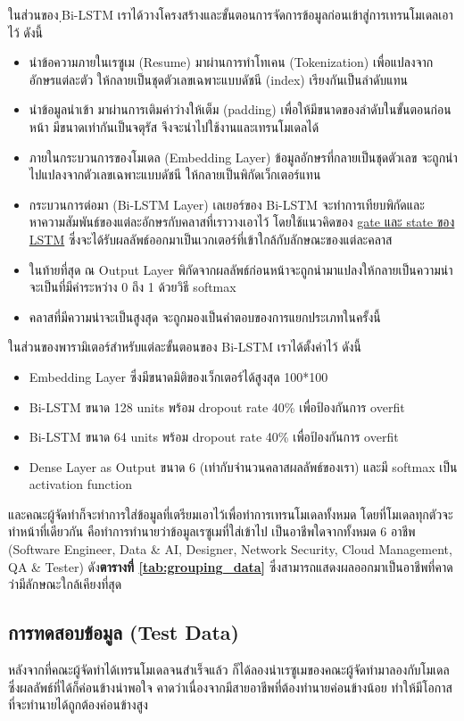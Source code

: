 ในส่วนของ ฺBi-LSTM เราได้วางโครงสร้างและขั้นตอนการจัดการข้อมูลก่อนเข้าสู่การเทรนโมเดลเอาไว้ ดังนี้
\begin{itemize}
    \item นำข้อความภายในเรซูเม (Resume) มาผ่านการทำโทเคน (Tokenization) เพื่อแปลงจากอักษรแต่ละตัว ให้กลายเป็นชุดตัวเลขเฉพาะแบบดัชนี (index) เรียงกันเป็นลำดับแทน
    \item นำข้อมูลนำเข้า มาผ่านการเติมค่าว่างให้เต็ม (padding) เพื่อให้มีขนาดของลำดับในขั้นตอนก่อนหน้า มีขนาดเท่ากันเป็นจตุรัส จึงจะนำไปใช้งานและเทรนโมเดลได้
    \item ภายในกระบวนการของโมเดล (Embedding Layer) ข้อมูลอักษรที่กลายเป็นชุดตัวเลข จะถูกนำไปแปลงจากตัวเลขเฉพาะแบบดัชนี ให้กลายเป็นพิกัดเว็กเตอร์แทน
    \item กระบวนการต่อมา (Bi-LSTM Layer) เลเยอร์ของ Bi-LSTM จะทำการเทียบพิกัดและหาความสัมพันธ์ของแต่ละอักษรกับคลาสที่เราวางเอาไว้ โดยใช้แนวคิดของ \hyperref[subsec:lstm]{gate และ state ของ LSTM} ซึ่งจะได้รับผลลัพธ์ออกมาเป็นเวกเตอร์ที่เข้าใกล้กับลักษณะของแต่ละคลาส
    \item ในท้ายที่สุด ณ Output Layer พิกัดจากผลลัพธ์ก่อนหน้าจะถูกนำมาแปลงให้กลายเป็นความน่าจะเป็นที่มีค่าระหว่าง 0 ถึง 1 ด้วยวิธี softmax
    \item คลาสที่มีความน่าจะเป็นสูงสุด จะถูกมองเป็นคำตอบของการแยกประเภทในครั้งนี้
\end{itemize}
ในส่วนของพารามิเตอร์สำหรับแต่ละขั้นตอนของ Bi-LSTM เราได้ตั้งค่าไว้ ดังนี้
\begin{itemize}
    \item Embedding Layer ซึ่งมีขนาดมิติของเว็กเตอร์ได้สูงสุด 100*100
    \item Bi-LSTM ขนาด 128 units พร้อม dropout rate 40\% เพื่อป้องกันการ overfit
    \item Bi-LSTM ขนาด 64 units พร้อม dropout rate 40\% เพื่อป้องกันการ overfit
    \item Dense Layer as Output ขนาด 6 (เท่ากับจำนวนคลาสผลลัพธ์ของเรา) และมี softmax เป็น activation function
\end{itemize}


\par และคณะผู้จัดทำก็จะทำการใส่ข้อมูลที่เตรียมเอาไว้เพื่อทำการเทรนโมเดลทั้งหมด โดยที่โมเดลทุกตัวจะทำหน้าที่เดียวกัน คือทำการทำนายว่าข้อมูลเรซูเมที่ใส่เข้าไป
เป็นอาชีพใดจากทั้งหมด 6 อาชีพ (Software Engineer, Data \& AI, Designer, Network Security, Cloud Management, QA \& Tester)
ดัง\textbf{ตารางที่ \ref{tab:grouping_data}} ซึ่งสามารถแสดงผลออกมาเป็นอาชีพที่คาดว่ามีลักษณะใกล้เคียงที่สุด

\subsection{การทดสอบข้อมูล (Test Data)}
หลังจากที่คณะผู้จัดทำได้เทรนโมเดลจนสำเร็จแล้ว ก็ได้ลองนำเรซูเมของคณะผู้จัดทำมาลองกับโมเดล ซึ่งผลลัพธ์ที่ได้ก็ค่อนข้างน่าพอใจ
คาดว่าเนื่องจากมีสายอาชีพที่ต้องทำนายค่อนข้างน้อย ทำให้มีโอกาสที่จะทำนายได้ถูกต้องค่อนข้างสูง

